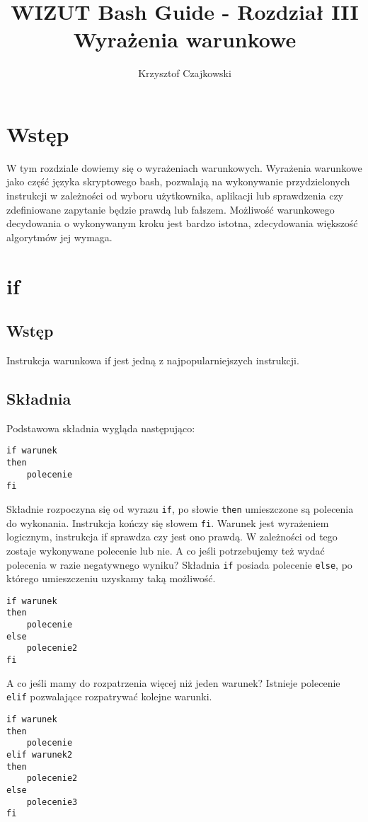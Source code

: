 \documentclass[10 pt, a4paper]{article}
\author{Krzysztof Czajkowski}
\title{WIZUT Bash Guide - Rozdział III\\
Wyrażenia warunkowe}
\begin{document}
\maketitle
\tableofcontents
\newpage

\section{Wstęp}
W tym rozdziale dowiemy się o wyrażeniach warunkowych. Wyrażenia warunkowe jako część języka skryptowego bash, pozwalają na wykonywanie przydzielonych instrukcji w zależności od wyboru użytkownika, aplikacji lub sprawdzenia czy zdefiniowane zapytanie będzie prawdą lub fałszem. Możliwość warunkowego decydowania o wykonywanym kroku jest bardzo istotna, zdecydowania większość algorytmów jej wymaga.
\section{if}
\subsection{Wstęp}
Instrukcja warunkowa if jest jedną z najpopularniejszych instrukcji.
\subsection{Składnia}
Podstawowa składnia wygląda następująco:
\begin{lstlisting}
if warunek
then
	polecenie
fi
\end{lstlisting}
Składnie rozpoczyna się od wyrazu \texttt{if}, po słowie \texttt{then} umieszczone są polecenia do wykonania. Instrukcja kończy się słowem \texttt{fi}. Warunek jest wyrażeniem logicznym, instrukcja if sprawdza czy jest ono prawdą. W zależności od tego zostaje wykonywane polecenie lub nie.\newline
A co jeśli potrzebujemy też wydać polecenia w razie negatywnego wyniku? Składnia \texttt{if} posiada polecenie \texttt{else}, po którego umieszczeniu uzyskamy taką możliwość.
\begin{lstlisting}
if warunek
then
	polecenie
else
	polecenie2
fi
\end{lstlisting}
A co jeśli mamy do rozpatrzenia więcej niż jeden warunek? Istnieje polecenie \texttt{elif} pozwalające rozpatrywać kolejne warunki.
\begin{lstlisting}
if warunek
then
	polecenie
elif warunek2
then
	polecenie2
else
	polecenie3
fi
\end{lstlisting}
\end{document}

